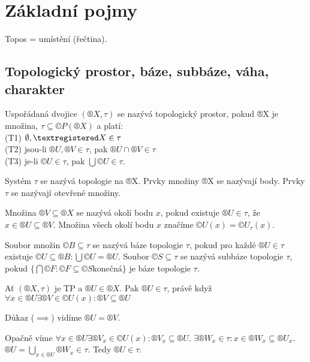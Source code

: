 \documentclass[12pt]{article}					%
\begin{document}
\section{Základní pojmy}
    Topos = umístění (řečtina).

    \subsection{Topologický prostor, báze, subbáze, váha, charakter}

    \begin{definice}
        Uspořádaná dvojice $(®X, \tau)$ se nazývá topologický prostor, pokud ®X je množina, $\tau \subseteq ©P(®X)$ a platí:\\
        (T1) $\O, ®X \in \tau$\\
        (T2) jsou-li $®U, ®V \in \tau$, pak $®U \cap ®V \in \tau$\\
        (T3) je-li $©U \in \tau$, pak $\bigcup ©U \in \tau$.
    \end{definice}

    \begin{definice}[Topologie]
        Systém $\tau$ se nazývá topologie na ®X. Prvky množiny ®X se nazývají body. Prvky $\tau$ se nazývají otevřené množiny.
    \end{definice}

    \begin{definice}
        Množina $®V \subseteq ®X$ se nazývá okolí bodu $x$, pokud existuje $®U \in \tau$, že $x \in ®U \subseteq ®V$. Množina všech okolí bodu $x$ značíme $©U(x) = ©U_\tau(x)$.
    \end{definice}

    \begin{definice}
        Soubor množin $©B \subseteq \tau$ se nazývá báze topologie $\tau$, pokud pro každé $®U\in \tau$ existuje $©U \subseteq ®B: \bigcup ©U = ®U$. Soubor $©S \subseteq \tau$ se nazývá subbáze topologie $\tau$, pokud $\{\bigcap ©F: ©F \subseteq ©S \text{konečná}\}$ je báze topologie $\tau$.
    \end{definice}

    \begin{tvrzeni}
        Ať $(®X, \tau)$ je TP a $®U \in ®X$. Pak $®U \in \tau$, právě když $\forall x \in ®U \exists ®V\in ©U(x): ®V \subseteq ®U$
        \begin{dukazin}
            Důkaz ($\implies$) vidíme $®U = ®V$.

            Opačně víme $\forall x \in ®U \exists ®V_x\in©U(x): ®V_x \subseteq ®U$. $\exists ®W_x \in \tau: x\in ®W_x \subseteq ®U_x$. $®U = \bigcup_{x\in ®U}®W_x \in \tau$. Tedy $®U \in \tau$.
        \end{dukazin}
    \end{tvrzeni}
\end{document}
